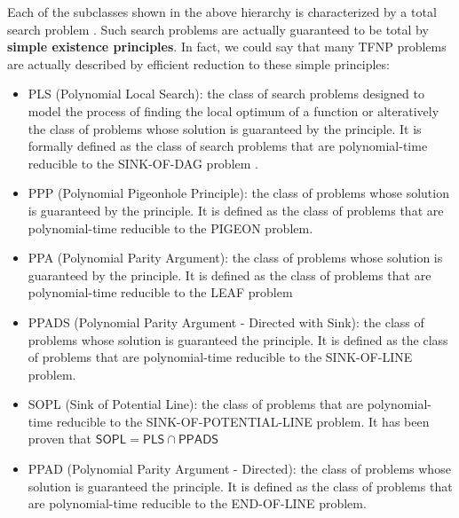 Each of the subclasses shown in the above hierarchy is characterized by a total search problem \cite{proofs_circuits_communication,tfnp_characterization}. Such search problems are actually guaranteed to be total by \textbf{simple existence principles}. In fact, we could say that many \textsf{TFNP} problems are actually described by efficient reduction to these simple principles:
\begin{itemize}
    \item \textsf{PLS} (Polynomial Local Search): the class of search problems designed to model the process of finding the local optimum of a function or alteratively the class of problems whose solution is guaranteed by the  principle. It is formally defined as the class of search problems that are polynomial-time reducible to the SINK-OF-DAG problem .
    
    \item \textsf{PPP} (Polynomial Pigeonhole Principle): the class of problems whose solution is guaranteed by the  principle. It is defined as the class of problems that are polynomial-time reducible to the PIGEON problem.
    
    \item \textsf{PPA} (Polynomial Parity Argument): the class of problems whose solution is guaranteed by the  principle. It is defined as the class of problems that are polynomial-time reducible to the LEAF problem
    
    \item \textsf{PPADS} (Polynomial Parity Argument - Directed with Sink): the class of problems whose solution is guaranteed the  principle. It is defined as the class of problems that are polynomial-time reducible to the SINK-OF-LINE problem.
    
    \item \textsf{SOPL} (Sink of Potential Line): the class of problems that are polynomial-time reducible to the SINK-OF-POTENTIAL-LINE problem. It has been proven that $\mathsf{SOPL} = \mathsf{PLS} \cap \mathsf{PPADS}$ \cite{Further_collapses_TFNP}
    
    \item \textsf{PPAD} (Polynomial Parity Argument - Directed): the class of problems whose solution is guaranteed the  principle. It is defined as the class of problems that are polynomial-time reducible to the END-OF-LINE problem.
    

\end{itemize}

